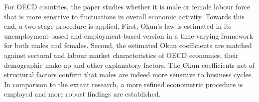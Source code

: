 
\begin{Abstrakt}
    For OECD countries, the paper studies whether it is male or female labour force that is more sensitive to fluctuations in overall economic activity. Towards this end, a two-stage procedure is applied. First, Okun's law is estimated in its unemployment-based and employment-based version in a time-varying framework for both males and females. Second, the estimated Okun coefficients are matched against sectoral and labour market characteristics of OECD economies, their demographic make-up and other explanatory factors. The Okun coefficients net of structural factors confirm that males are indeed more sensitive to business cycles. In comparison to the extant research, a more refined econometric procedure is employed and more robust findings are established.
\end{Abstrakt}



\clearpage